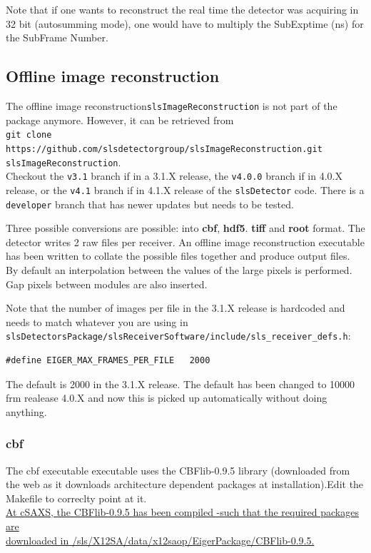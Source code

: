 \documentclass{article}
\begin{document}
{{{Note that if one wants to  reconstruct the real time the detector was acquiring in 32 bit (autosumming mode), one would have to multiply the SubExptime (ns) for the SubFrame Number. 

\subsection{Offline image reconstruction}
The offline image reconstruction{\tt{slsImageReconstruction}} is not part of the package anymore. However, it can be retrieved from \\
{\tt{git clone https://github.com/slsdetectorgroup/slsImageReconstruction.git slsImageReconstruction}}.\\
Checkout the {\tt{v3.1}} branch if in a 3.1.X release, the {\tt{v4.0.0}} branch if in 4.0.X release, or the {\tt{v4.1}} branch if in 4.1.X release of the {\tt{slsDetector}} code. There is a {\tt{developer}} branch that has newer updates but needs to be tested.

Three possible conversions are possible: into \textbf{cbf}, \textbf{hdf5}. \textbf{tiff} and  \textbf{root} format. The detector writes 2 raw files per receiver. An offline image reconstruction executable has been written to collate the possible files together and produce output files. By default an interpolation between the values of the large pixels is performed. Gap pixels between modules are also inserted.

Note that the number of images per file in the 3.1.X release is hardcoded and needs to match whatever you are using in \\
{\tt{slsDetectorsPackage/slsReceiverSoftware/include/sls\_receiver\_defs.h}}:
\begin{verbatim}
#define EIGER_MAX_FRAMES_PER_FILE	2000
\end{verbatim}
The default is 2000 in the 3.1.X release. The default has been changed to 10000 frm realease 4.0.X and now this is picked up automatically without doing anything. 

\subsubsection{cbf}
The cbf executable executable uses the CBFlib-0.9.5 library (downloaded from the web as it downloads architecture dependent packages at installation).Edit the Makefile to correclty point at it.\\
\underline{At cSAXS, the CBFlib-0.9.5 has been compiled -such that the required packages are}\\\underline{ downloaded in /sls/X12SA/data/x12saop/EigerPackage/CBFlib-0.9.5.}\\ 

}}}
\end{document}
